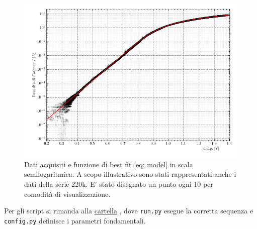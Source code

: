 \documentclass{article}[a4paper, oneside, 11pt]
\begin{document}
\begin{figure}[H]
	\centering 
	\includegraphics[scale=0.7]{diode_semilog.png}%
	\caption{Dati acquisiti e funzione di best fit \eqref{eq: model} in 
	scala semilogaritmica. A scopo illustrativo sono stati rappresentati anche i dati della serie 220k. E' stato disegnato un punto ogni 10 per comodità di visualizzazione. \label{fig: sck_log}}
\end{figure}

Per gli script si rimanda alla 
\href{https://github.com/LucaCiucci/relaz_seme/tree/master/Cartella_fit}{cartella}
, dove \verb+run.py+ esegue la corretta sequenza e \verb+config.py+ definisce 
i parametri fondamentali.

\end{document}
